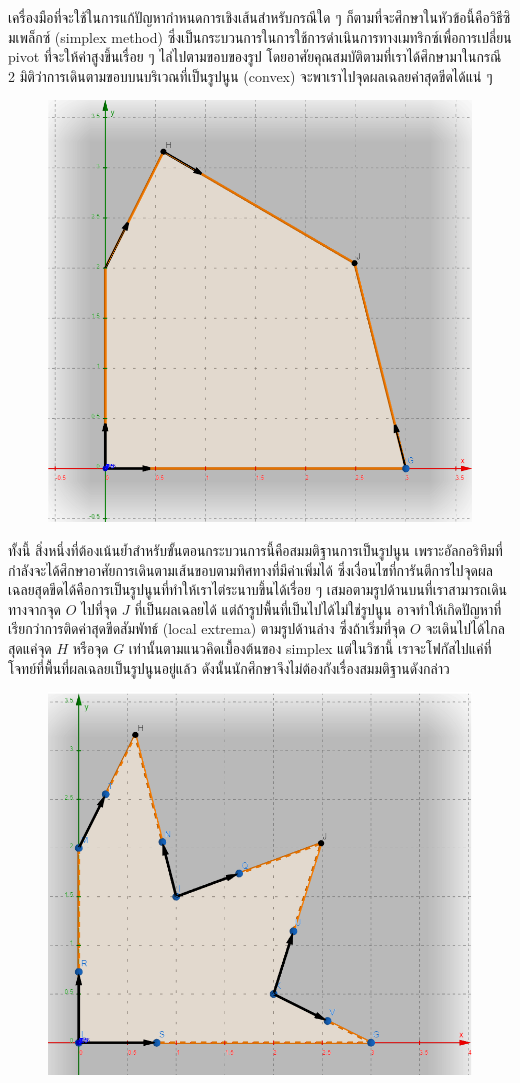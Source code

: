 เครื่องมือที่จะใช้ในการแก้ปัญหากำหนดการเชิงเส้นสำหรับกรณีใด ๆ ก็ตามที่จะศึกษาในหัวข้อนี้คือวิธีซิมเพล็กซ์ (simplex method) ซึ่งเป็นกระบวนการในการใช้การดำเนินการทางเมทริกซ์เพื่อการเปลี่ยน pivot ที่จะให้ค่าสูงขึ้นเรื่อย ๆ ไล่ไปตามขอบของรูป โดยอาศัยคุณสมบัติตามที่เราได้ศึกษามาในกรณี 2 มิติว่าการเดินตามขอบบนบริเวณที่เป็นรูปนูน (convex) จะพาเราไปจุดผลเฉลยค่าสุดขีดได้แน่ ๆ

\begin{figure}[h]
    \centering
    \includegraphics[width=0.5\linewidth]{simplex2.png}
\end{figure}

ทั้งนี้ สิ่งหนึ่งที่ต้องเน้นย้ำสำหรับขั้นตอนกระบวนการนี้คือสมมติฐานการเป็นรูปนูน เพราะอัลกอริทึมที่กำลังจะได้ศึกษาอาศัยการเดินตามเส้นขอบตามทิศทางที่มีค่าเพิ่มได้ ซึ่งเงื่อนไขที่การันตีการไปจุดผลเฉลยสุดขีดได้คือการเป็นรูปนูนที่ทำให้เราไต่ระนาบขึ้นได้เรื่อย ๆ เสมอตามรูปด้านบนที่เราสามารถเดินทางจากจุด $O$ ไปที่จุด $J$ ที่เป็นผลเฉลยได้ แต่ถ้ารูปพื้นที่เป็นไปได้ไม่ใช่รูปนูน อาจทำให้เกิดปัญหาที่เรียกว่าการติดค่าสุดขีดสัมพัทธ์ (local extrema) ตามรูปด้านล่าง ซึ่งถ้าเริ่มที่จุด $O$ จะเดินไปได้ไกลสุดแค่จุด $H$ หรือจุด $G$ เท่านั้นตามแนวคิดเบื้องต้นของ simplex แต่ในวิชานี้ เราจะโฟกัสไปแค่ที่โจทย์ที่พื้นที่ผลเฉลยเป็นรูปนูนอยู่แล้ว ดังนั้นนักศึกษาจึงไม่ต้องกังเรื่องสมมติฐานดังกล่าว

\begin{figure}[h]
    \centering
    \includegraphics[width=0.4\linewidth]{simplex3.png}
\end{figure}

